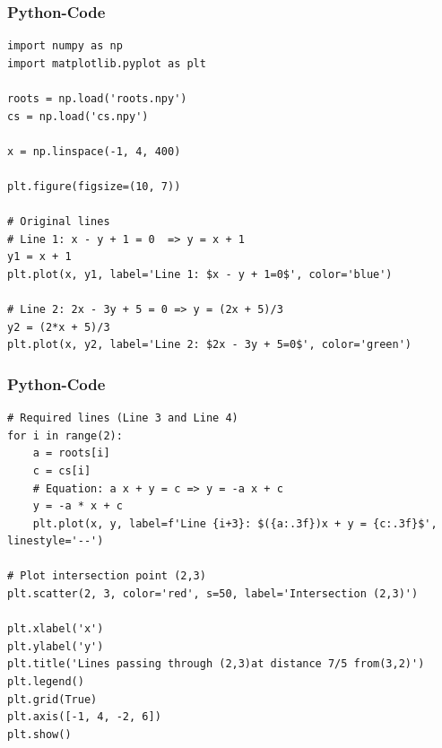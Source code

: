 \documentclass{beamer}
\begin{document}
\begin{frame}[fragile]
\frametitle{Python-Code}
\begin{lstlisting}
import numpy as np
import matplotlib.pyplot as plt

roots = np.load('roots.npy')
cs = np.load('cs.npy')

x = np.linspace(-1, 4, 400)

plt.figure(figsize=(10, 7))

# Original lines
# Line 1: x - y + 1 = 0  => y = x + 1
y1 = x + 1
plt.plot(x, y1, label='Line 1: $x - y + 1=0$', color='blue')

# Line 2: 2x - 3y + 5 = 0 => y = (2x + 5)/3
y2 = (2*x + 5)/3
plt.plot(x, y2, label='Line 2: $2x - 3y + 5=0$', color='green')
\end{lstlisting}
\end{frame}

\begin{frame}[fragile]
\frametitle{Python-Code}
\begin{lstlisting}
# Required lines (Line 3 and Line 4)
for i in range(2):
    a = roots[i]
    c = cs[i]
    # Equation: a x + y = c => y = -a x + c
    y = -a * x + c
    plt.plot(x, y, label=f'Line {i+3}: $({a:.3f})x + y = {c:.3f}$', linestyle='--')

# Plot intersection point (2,3)
plt.scatter(2, 3, color='red', s=50, label='Intersection (2,3)')

plt.xlabel('x')
plt.ylabel('y')
plt.title('Lines passing through (2,3)at distance 7/5 from(3,2)')
plt.legend()
plt.grid(True)
plt.axis([-1, 4, -2, 6])
plt.show()
\end{lstlisting}
\end{frame}
\end{document}
